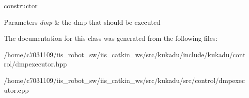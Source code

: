 constructor 


\begin{DoxyParams}{Parameters}
{\em dmp} & the dmp that should be executed \\
\hline
\end{DoxyParams}


The documentation for this class was generated from the following files\-:\begin{DoxyCompactItemize}
\item 
/home/c7031109/iis\-\_\-robot\-\_\-sw/iis\-\_\-catkin\-\_\-ws/src/kukadu/include/kukadu/control/dmpexecutor.\-hpp\item 
/home/c7031109/iis\-\_\-robot\-\_\-sw/iis\-\_\-catkin\-\_\-ws/src/kukadu/src/control/dmpexecutor.\-cpp\end{DoxyCompactItemize}
